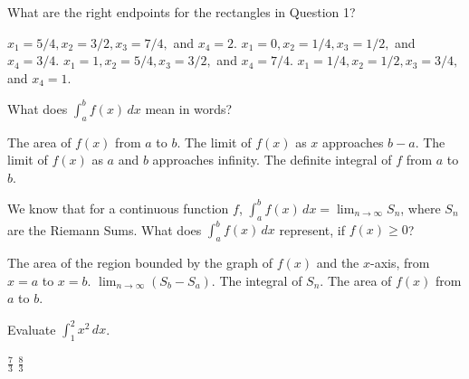 \documentclass[addpoints, 12pt]{exam}%
\newcommand{\spc}{\vspace*{0.5cm}}
\begin{document}
\begin{questions}
\question[1]

What are the right endpoints for the rectangles in Question 1?

\begin{multicols}{2}
\begin{choices}
\CorrectChoice $x_1 = 5/4, x_2 = 3/2, x_3 = 7/4,$ and $x_4 = 2$. 
\choice $x_1 = 0, x_2 = 1/4, x_3 = 1/2,$ and $x_4 = 3/4$.
\choice $x_1 = 1, x_2 = 5/4, x_3 = 3/2,$ and $x_4 = 7/4$.
\choice $x_1 = 1/4, x_2 = 1/2, x_3 = 3/4,$ and $x_4 = 1$.
\end{choices}
\end{multicols}

\spc

\question[1]

What does $\int_{a}^{b} f(x) \,dx$ mean in words?

\begin{multicols}{2}
\begin{choices}
\choice The area of $f(x)$ from $a$ to $b$.
\choice The limit of $f(x)$ as $x$ approaches $b-a$.
\choice The limit of $f(x)$ as $a$ and $b$ approaches infinity.
\CorrectChoice The definite integral of $f$ from $a$ to $b$.
\end{choices}
\end{multicols}

\newpage



\question[1]

We know that for a continuous function $f$, $\int_{a}^{b} f(x) \,dx = \lim_{n \to \infty} S_n$, where $S_n$ are the Riemann Sums. What does $\int_{a}^{b} f(x) \,dx$ represent, if $f(x) \geq 0$?

\begin{multicols}{2}
\begin{choices}
\CorrectChoice The area of the region bounded by the graph of $f(x)$ and the $x$-axis, from $x = a$ to $x= b$.
\choice $\lim_{n \to \infty} (S_b - S_a)$.
\choice The integral of $S_n$.
\choice The area of $f(x)$ from $a$ to $b$.
\end{choices}
\end{multicols}

\spc

\question[1]

Evaluate $\int_{1}^{2} x^2 \,dx$.

\begin{multicols}{2}
\begin{choices}
\CorrectChoice $\frac{7}{3}$
\choice $\frac{8}{3}$
\end{choices}
\end{multicols}


\end{questions}
\end{document}
